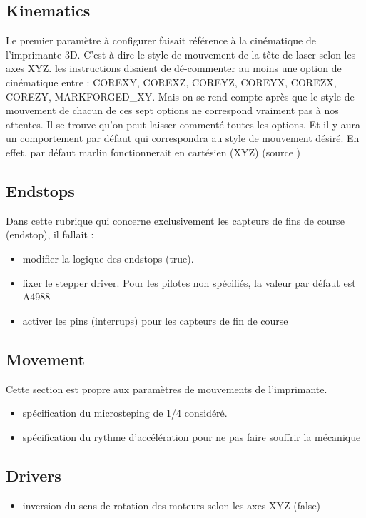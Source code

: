 \subsection{Kinematics}
Le premier paramètre à configurer faisait référence à la cinématique de l'imprimante 3D. C'est à dire le style de mouvement de la tête de laser selon les axes XYZ. les instructions disaient de dé-commenter au moins une option de cinématique entre : COREXY, COREXZ, COREYZ, COREYX, COREZX, COREZY, MARKFORGED\_XY. Mais on se rend compte après que le style de mouvement de chacun de ces sept options ne correspond vraiment pas à nos attentes. Il se trouve qu'on peut laisser commenté toutes les options. Et il y aura un comportement par défaut qui correspondra au style de mouvement désiré. En effet, par défaut marlin fonctionnerait en cartésien (XYZ) (source \footnotemark)

\subsection{Endstops }
Dans cette rubrique qui concerne exclusivement les capteurs de fins de course (endstop), il fallait :
\begin{itemize}
	\item modifier la logique des endstops (true).
	\item fixer le stepper driver. Pour les pilotes non spécifiés, la valeur par défaut est A4988
	\item activer les pins (interrups) pour les capteurs de fin de course 
\end{itemize}

\subsection{Movement}
Cette section est propre aux paramètres de mouvements de l'imprimante.
\begin{itemize}
	\item spécification du microsteping de 1/4 considéré.
	\item spécification du rythme d'accélération pour ne pas faire souffrir la mécanique
\end{itemize}

\subsection{Drivers}
\begin{itemize}
	\item inversion du sens de rotation des moteurs selon les axes XYZ (false)
\end{itemize}

